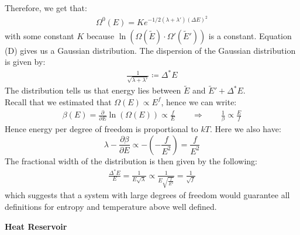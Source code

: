 \documentclass[11pt]{article}
\theoremstyle{break}
\theoremstyle{break}
\begin{document}
Therefore, we get that: 
\begin{align*}
\Omega^0(E) = K e^{-1/2(\lambda+\lambda')(\Delta E)^2} \tag{D}
\end{align*}
with some constant $K$ because $\ln(\Omega(\widetilde{E})\cdot \Omega'(\widetilde{E}'))$ is a constant. Equation (D) gives us a Gaussian distribution. The dispersion of the Gaussian distribution is given by:
\begin{align*}
\frac{1}{\sqrt{\lambda+\lambda'}} \coloneqq \Delta^* E
\end{align*}
The distribution tells us that energy lies between $\widetilde{E}$ and $\widetilde{E}' + \Delta^* E$.\\ 
Recall that we estimated that $\Omega(E) \propto E^f$, hence we can write:
\begin{align*}
\beta(E) = \frac{\partial }{\partial E}\ln(\Omega(E)) \propto \frac{f}{E}\qquad\Rightarrow\qquad \frac{1}{\beta} \propto \frac{E}{f}
\end{align*}
Hence energy per degree of freedom is proportional to $kT$. Here we also have:
$$\lambda - \frac{\partial \beta}{\partial E} \propto -\left(-\frac{f}{E^2}\right) = \frac{f}{E^2}$$
The fractional width of the distribution is then given by the following:
\begin{align*}
\frac{\Delta^*E}{E}=\frac{1}{E\sqrt{\lambda}} \propto  \frac{1}{E\sqrt{\frac{f}{E^2}}} = \frac{1}{\sqrt{f}}
\end{align*}
which suggests that a system with large degrees of freedom would guarantee all definitions for entropy and temperature above well defined. 

\newpage
\textbf{Heat Reservoir}\\
\end{document}
